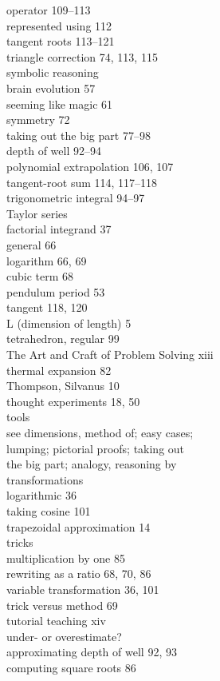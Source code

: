 \documentclass[a4paper,fleqn]{article}
\begin{document}
\begin{multicols}{2}
operator 109–113\\
represented using 112\\
tangent roots 113–121\\
triangle correction 74, 113, 115 \\
symbolic reasoning \\
brain evolution 57\\
seeming like magic 61\\
symmetry 72\\

taking out the big part 77–98\\
depth of well 92–94\\
polynomial extrapolation 106, 107 \\
tangent-root sum 114, 117–118\\
trigonometric integral 94–97\\
Taylor series\\
factorial integrand 37\\
general 66\\
logarithm 66, 69\\
cubic term 68 \\
pendulum period 53 \\
tangent 118, 120\\
L (dimension of length) 5 \\
tetrahedron, regular 99 \\
The Art and Craft of Problem Solving xiii\\
thermal expansion 82 \\
Thompson, Silvanus 10 \\
thought experiments 18, 50 \\
tools\\
see dimensions, method of; easy cases;\\
lumping; pictorial proofs; taking out \\
the big part; analogy, reasoning by\\ transformations \\
logarithmic 36\\
taking cosine 101 \\
trapezoidal approximation 14 \\
tricks \\
multiplication by one 85\\
rewriting as a ratio 68, 70, 86\\
variable transformation 36, 101\\
trick versus method 69 \\
tutorial teaching xiv\\

under- or overestimate? \\
approximating depth of well 92, 93\\ 
computing square roots 86\\\\\\
\end{multicols}
\end{document}
